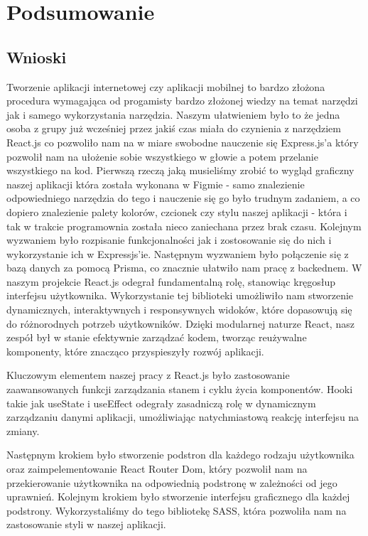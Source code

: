 \newpage
\section{Podsumowanie}

\subsection{Wnioski}

Tworzenie aplikacji internetowej czy aplikacji mobilnej to 
bardzo złożona procedura wymagająca od progamisty bardzo złożonej 
wiedzy na temat narzędzi jak i samego wykorzystania narzędzia. 
Naszym ułatwieniem było to że jedna osoba z grupy już wcześniej 
przez jakiś czas miała do czynienia z narzędziem React.js co 
pozwoliło nam na w miare swobodne nauczenie się Express.js'a 
który pozwolił nam na ułożenie sobie wszystkiego w głowie a 
potem przelanie wszystkiego na kod. 
Pierwszą rzeczą jaką musieliśmy zrobić to wygląd graficzny 
naszej aplikacji która została wykonana w Figmie - 
samo znalezienie odpowiedniego narzędzia do tego i 
nauczenie się go było trudnym zadaniem, a 
co dopiero znalezienie palety kolorów, 
czcionek czy stylu naszej aplikacji - 
która i tak w trakcie programownia 
została nieco zaniechana przez brak czasu. 
Kolejnym wyzwaniem było rozpisanie funkcjonalności
jak i zostosowanie się do nich i wykorzystanie ich w Expressjs'ie.
Następnym wyzwaniem było połączenie się z bazą danych za pomocą Prisma,
co znacznie ułatwiło nam pracę z backednem.
W naszym projekcie React.js odegrał fundamentalną rolę, stanowiąc kręgosłup interfejsu użytkownika. Wykorzystanie tej biblioteki umożliwiło nam stworzenie dynamicznych, interaktywnych i responsywnych widoków, które dopasowują się do różnorodnych potrzeb użytkowników. Dzięki modularnej naturze React, nasz zespół był w stanie efektywnie zarządzać kodem, tworząc reużywalne komponenty, które znacząco przyspieszyły rozwój aplikacji.

Kluczowym elementem naszej pracy z React.js było zastosowanie zaawansowanych funkcji zarządzania stanem i cyklu życia komponentów. Hooki takie jak useState i useEffect odegrały zasadniczą rolę w dynamicznym zarządzaniu danymi aplikacji, umożliwiając natychmiastową reakcję interfejsu na zmiany.

Następnym krokiem było stworzenie podstron dla każdego rodzaju użytkownika 
oraz zaimpelementowanie React Router Dom, który pozwolił nam na
przekierowanie użytkownika na odpowiednią podstronę w zależności od jego uprawnień.
Kolejnym krokiem było stworzenie interfejsu graficznego dla każdej podstrony.
Wykorzystaliśmy do tego bibliotekę SASS, która pozwoliła nam na
zastosowanie styli w naszej aplikacji. 


